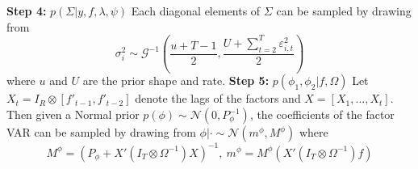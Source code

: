 \documentclass[notitlepage,a4paper,12pt]{article}
\begin{document}
\textbf{Step 4:} $p(\Sigma| y, f, \lambda, \psi)$
\newline       
Each diagonal elements of $\Sigma$ can be sampled by drawing from 
\begin{equation*}
\sigma^2_i \sim \mathcal{G}^{-1} \left( \frac{u + T-1}{2},\frac{U + \sum_{t=2}^T \varepsilon_{i,t}^2}{2} \right)
\end{equation*}  where $u$ and $U$ are the prior shape and rate.
\newline
\linebreak
\textbf{Step 5:} $p(\phi_1, \phi_2| f, \Omega)$
\newline  
Let $X_t = I_R \otimes [f'_{t-1}, f'_{t-2}]$ denote the lags of the factors and $X = [X_1, \dots, X_t]$. Then given a Normal prior $p(\phi) \sim \mathcal{N}(0, P_{\phi}^{-1})$, the coefficients of the factor VAR can be sampled by drawing from $\phi | \cdot \sim \mathcal{N}(m^{\phi}, M^{\phi})$ where
$$
M^{\phi} = (P_{\phi} + X' (I_T \otimes \Omega^{-1})X)^{-1}, \: m^{\phi} = M^{\phi} (X' (I_T \otimes \Omega^{-1})f)
$$
\newline
\end{document}
